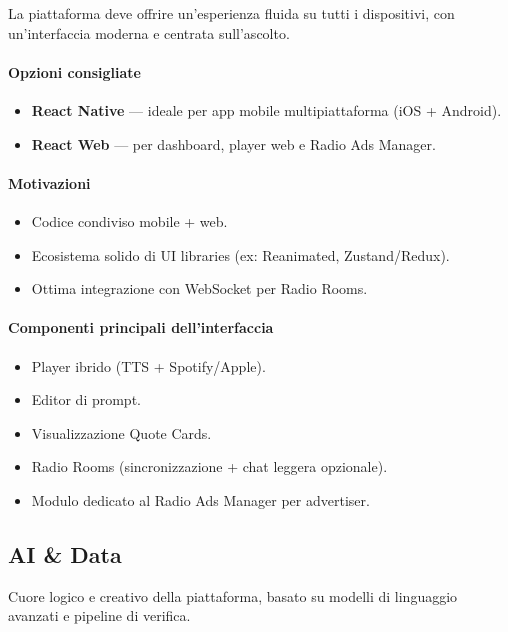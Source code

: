 \documentclass[11pt,a4paper]{article}
\begin{document}
La piattaforma deve offrire un’esperienza fluida su tutti i dispositivi, con un'interfaccia moderna e centrata sull’ascolto.

\paragraph{Opzioni consigliate}
\begin{itemize}
    \item \textbf{React Native} — ideale per app mobile multipiattaforma (iOS + Android).
    \item \textbf{React Web} — per dashboard, player web e Radio Ads Manager.
\end{itemize}

\paragraph{Motivazioni}
\begin{itemize}
    \item Codice condiviso mobile + web.
    \item Ecosistema solido di UI libraries (ex: Reanimated, Zustand/Redux).
    \item Ottima integrazione con WebSocket per Radio Rooms.
\end{itemize}

\paragraph{Componenti principali dell’interfaccia}
\begin{itemize}
    \item Player ibrido (TTS + Spotify/Apple).
    \item Editor di prompt.
    \item Visualizzazione Quote Cards.
    \item Radio Rooms (sincronizzazione + chat leggera opzionale).
    \item Modulo dedicato al Radio Ads Manager per advertiser.
\end{itemize}


\subsection{AI \& Data}

Cuore logico e creativo della piattaforma, basato su modelli di linguaggio avanzati e pipeline di verifica.
\end{document}
